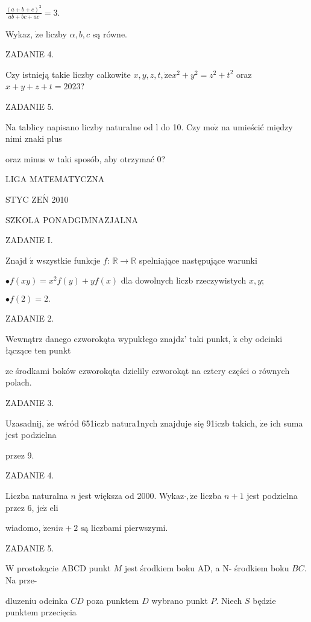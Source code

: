 \documentclass[a4paper,12pt]{article}
\begin{document}
$\displaystyle \frac{(a+b+c)^{2}}{ab+bc+ac}=3.$

Wykaz, $\dot{\mathrm{z}}\mathrm{e}$ liczby $\alpha, b, c$ są równe.

ZADANIE 4.

Czy istnieją takie liczby calkowite $x, y, z, t, \dot{\mathrm{z}}\mathrm{e}x^{2}+y^{2}=z^{2}+t^{2}$ oraz $x+y+z+t=2023$?

ZADANIE 5.

Na tablicy napisano liczby naturalne od l do 10. Czy $\mathrm{m}\mathrm{o}\dot{\mathrm{z}}$ na umieścić między nimi znaki plus

oraz minus w taki sposób, aby otrzymać 0?






LIGA MATEMATYCZNA

STYC Z$\mathrm{E}\acute{\mathrm{N}}$ 2010

SZKOLA PONADGIMNAZJALNA

ZADANIE I.

Znajd $\acute{\mathrm{z}}$ wszystkie funkcje $f$: $\mathbb{R}\rightarrow \mathbb{R}$ spelniające następujące warunki

$\bullet f(xy)=x^{2}f(y)+yf(x)$ dla dowolnych liczb rzeczywistych $x, y$;

$\bullet f(2)=2.$

ZADANIE 2.

Wewnątrz danego czworokąta wypukłego znajdz' taki punkt, $\dot{\mathrm{z}}$ eby odcinki łączące ten punkt

ze środkami boków czworokqta dzielily czworokąt na cztery części o równych polach.

ZADANIE 3.

Uzasadnij, $\dot{\mathrm{z}}\mathrm{e}$ wśród 651iczb natura1nych znajduje się 91iczb takich, $\dot{\mathrm{z}}\mathrm{e}$ ich suma jest podzielna

przez 9.

ZADANIE 4.

Liczba naturalna $n$ jest większa od 2000. Wykaz$\cdot, \dot{\mathrm{z}}\mathrm{e}$ liczba $n+1$ jest podzielna przez 6, $\mathrm{j}\mathrm{e}\dot{\mathrm{z}}$ eli

wiadomo, $\dot{\mathrm{z}}\mathrm{e}n\mathrm{i}n+2$ są liczbami pierwszymi.

ZADANIE 5.

$\mathrm{W}$ prostokącie ABCD punkt $M$ jest środkiem boku AD, a N- środkiem boku $BC$. Na prze-

dluzeniu odcinka $CD$ poza punktem $D$ wybrano punkt $P$. Niech $S$ będzie punktem przecięcia
\end{document}
